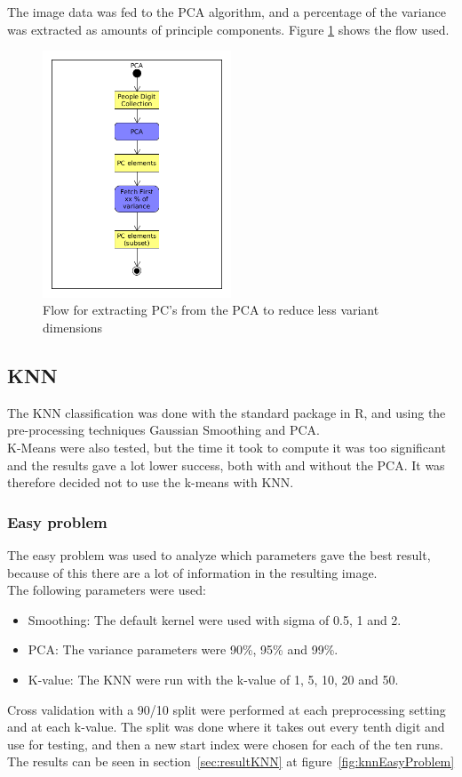 \documentclass[report]{subfiles}
\begin{document}
The image data was fed to the PCA algorithm, and a percentage of the variance was extracted as amounts of principle components. Figure \ref{fig:pca} shows the flow used.

\begin{figure}[H]
  \centering
  \includegraphics[width=0.5\textwidth]{UML/PCA}
  \caption{Flow for extracting PC's from the PCA to reduce less variant dimensions}
  \label{fig:pca}
\end{figure}

\subsection{KNN}
\label{sec:impKNN}

The KNN classification was done with the standard package in R, and using the pre-processing techniques Gaussian Smoothing and PCA.\\
K-Means were also tested, but the time it took to compute it was too significant and the results gave a lot lower success, both with and without the PCA. It was therefore decided not to use the k-means with KNN.

\subsubsection{Easy problem}
The easy problem was used to analyze which parameters gave the best result, because of this there are a lot of information in the resulting image.\\
The following parameters were used:
\begin{itemize}
  \item Smoothing: The default kernel were used with sigma of 0.5, 1 and 2.
  \item PCA: The variance parameters were 90\%, 95\% and 99\%.
  \item K-value: The KNN were run with the k-value of 1, 5, 10, 20 and 50.
\end{itemize}
Cross validation with a 90/10 split were performed at each preprocessing setting and at each k-value. The split was done where it takes out every tenth digit and use for testing, and then a new start index were chosen for each of the ten runs.
The results can be seen in section~\ref{sec:resultKNN}  at figure~\ref{fig:knnEasyProblem}
\end{document}
